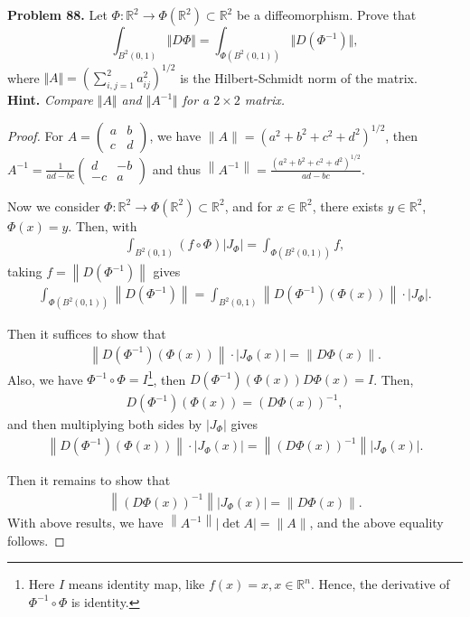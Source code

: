 \documentclass[11pt]{article}
\theoremstyle{definition}
\theoremstyle{definition}
\begin{document}
\noindent
{\bf Problem 88.}
Let $\Phi:\mathbb{R}^2\to\Phi(\mathbb{R}^2)\subset\mathbb{R}^2$ be a diffeomorphism. Prove that
$$
\int_{B^2(0,1)}\Vert D\Phi\Vert  =\int_{\Phi(B^2(0,1))}\Vert D(\Phi^{-1})\Vert,
$$
where $\Vert A\Vert=(\sum_{i,j=1}^2 a_{ij}^2)^{1/2}$ is the Hilbert-Schmidt norm of the matrix.\\
{\bf Hint.} {\em Compare $\Vert A\Vert$ and $\Vert A^{-1}\Vert$ for a $2\times 2$ matrix.}
\begin{proof}
For $A = \begin{pmatrix} 
    a & b \\
    c & d
\end{pmatrix}$, we have $\|A\| = \left(a^2 + b^2 + c^2 + d^2\right)^{1/2}$, then $A^{-1} = \frac{1}{ad - bc}\begin{pmatrix} 
    d & -b \\
    -c & a
\end{pmatrix}$ and thus $\left\|A^{-1}\right\| = \frac{\left(a^2 + b^2 + c^2 + d^2\right)^{1/2}}{ad - bc}$. 

Now we consider $\Phi: \mathbb{R}^2 \to \Phi\left(\mathbb{R}^2\right) \subset \mathbb{R}^2$, and for $x \in \mathbb{R}^2$, there exists $y \in \mathbb{R}^2$, $\Phi(x) = y$. Then, with 
\begin{align*}
    \int_{B^2(0,1)} (f \circ \Phi)\left|J_\Phi\right| = \int_{\Phi\left(B^2(0,1)\right)} f,
\end{align*}
taking $f = \left\|D\left(\Phi^{-1}\right) \right\|$ gives
\begin{align*}
    \int_{\Phi\left(B^2(0,1)\right)} \left\|D\left(\Phi^{-1}\right) \right\| = \int_{B^2(0,1)} \left\|D\left(\Phi^{-1}\right) (\Phi(x)) \right\| \cdot \left|J_\Phi\right|.
\end{align*}

Then it suffices to show that
\begin{align*}
    \left\|D\left(\Phi^{-1}\right) (\Phi(x)) \right\| \cdot \left|J_\Phi(x)\right| = \left\|D\Phi(x) \right\|.
\end{align*}
Also, we have $\Phi^{-1} \circ \Phi = I$\footnote{Here $I$ means identity map, like $f(x) = x, x \in \mathbb{R}^n$. Hence, the derivative of $\Phi^{-1} \circ \Phi$ is identity.}, then $D\left(\Phi^{-1}\right)(\Phi(x)) D\Phi(x) = I$. Then,
\begin{align*}
    D\left(\Phi^{-1}\right)(\Phi(x)) = \left(D\Phi(x)\right)^{-1},
\end{align*}
and then multiplying both sides by $\left|J_\Phi\right|$ gives
\begin{align*}
    \left\|D\left(\Phi^{-1}\right) (\Phi(x)) \right\| \cdot \left|J_\Phi(x)\right| = \left\|\left(D\Phi(x)\right)^{-1} \right\| \left|J_\Phi(x)\right|.
\end{align*}

Then it remains to show that 
\begin{align*}
    \left\|\left(D\Phi(x)\right)^{-1} \right\| \left|J_\Phi(x)\right| = \left\|D\Phi(x) \right\|.
\end{align*}
With above results, we have $\left\|A^{-1}\right\| |\det A|= \|A\|$, and the above equality follows.
\end{proof}
\end{document}
